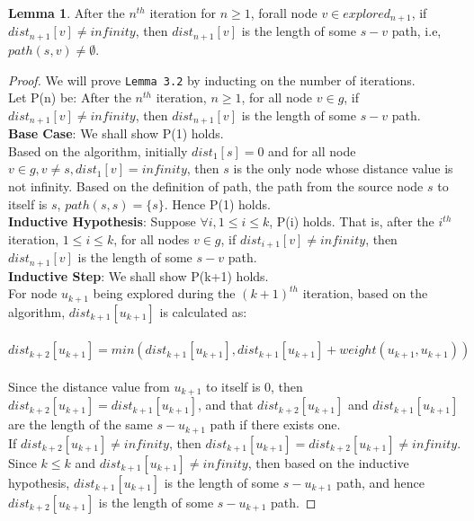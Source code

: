 \documentclass[11pt, oneside]{article}   	%
\theoremstyle{definition}
\newtheorem{sublemma}{Lemma}[section]
\begin{document}
\begin{sublemma}
After the $n^{th}$ iteration for $n \geq 1$, forall node $v \in explored_{n+1}$, if $dist_{n+1}[v] \neq infinity$, then $dist_{n+1}[v]$ is the length of some $s-v$ path, i.e, $path(s, v) \neq \emptyset$.  
\end{sublemma}
\begin{proof}
We will prove \texttt{Lemma 3.2} by inducting on the number of iterations. 
\\
Let P(n) be: After the $n^{th}$ iteration, $n \geq 1$, for all node $v \in g$, if $dist_{n+1}[v] \neq infinity$, then $dist_{n+1}[v]$ is the length of some $s-v$ path. 
\\
\textbf{Base Case}: We shall show P(1) holds. 
\\
Based on the algorithm, initially $dist_1[s] = 0$ and for all node $v \in g, v \neq s, dist_1[v] = infinity$, then $s$ is the only node whose distance value is not infinity. Based on the definition of path, the path from the source node $s$ to itself is $s$, $path(s, s) = \{s\}$. Hence P(1) holds. 
\\
\textbf{Inductive Hypothesis}: Suppose $\forall i, 1 \leq i \leq k$, P(i) holds. That is, after the $i^{th}$ iteration, $1 \leq i \leq k$, for all nodes $v \in g$, if $dist_{i+1}[v] \neq infinity$, then $dist_{n+1}[v]$ is the length of some $s-v$ path. 
\\
\textbf{Inductive Step}: We shall show P(k+1) holds.
\\
For node $u_{k+1}$ being explored during the $(k+1)^{th}$ iteration, based on the algorithm, $dist_{k+1}[u_{k+1}]$ is calculated as: 
\\\\
      $dist_{k+2}[u_{k+1}] = min(dist_{k+1}[u_{k+1}], dist_{k+1}[u_{k+1}] + weight(u_{k+1},u_{k+1}))$
\\\\
Since the distance value from $u_{k+1}$ to itself is $0$, then $dist_{k+2}[u_{k+1}] = dist_{k+1}[u_{k+1}]$, and that $dist_{k+2}[u_{k+1}]$ and $dist_{k+1}[u_{k+1}]$ are the length of the same $s-u_{k+1}$ path if there exists one. 
\\
If $dist_{k+2}[u_{k+1}] \neq infinity$, then $dist_{k+1}[u_{k+1}] = dist_{k+2}[u_{k+1}] \neq infinity$. Since $k \leq k$ and $dist_{k+1}[u_{k+1}] \neq infinity$, then based on the inductive hypothesis, $dist_{k+1}[u_{k+1}]$ is the length of some $s-u_{k+1}$ path, and hence $dist_{k+2}[u_{k+1}]$ is the length of some $s-u_{k+1}$ path.

\end{proof}
\end{document}
